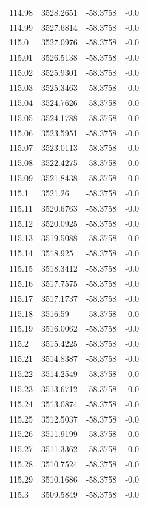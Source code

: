 \begin{table}[H]
\begin{tabular}{llll}
114.98 & 3528.2651 & -58.3758 & -0.0 \\
114.99 & 3527.6814 & -58.3758 & -0.0 \\
115.0 & 3527.0976 & -58.3758 & -0.0 \\
115.01 & 3526.5138 & -58.3758 & -0.0 \\
115.02 & 3525.9301 & -58.3758 & -0.0 \\
115.03 & 3525.3463 & -58.3758 & -0.0 \\
115.04 & 3524.7626 & -58.3758 & -0.0 \\
115.05 & 3524.1788 & -58.3758 & -0.0 \\
115.06 & 3523.5951 & -58.3758 & -0.0 \\
115.07 & 3523.0113 & -58.3758 & -0.0 \\
115.08 & 3522.4275 & -58.3758 & -0.0 \\
115.09 & 3521.8438 & -58.3758 & -0.0 \\
115.1 & 3521.26 & -58.3758 & -0.0 \\
115.11 & 3520.6763 & -58.3758 & -0.0 \\
115.12 & 3520.0925 & -58.3758 & -0.0 \\
115.13 & 3519.5088 & -58.3758 & -0.0 \\
115.14 & 3518.925 & -58.3758 & -0.0 \\
115.15 & 3518.3412 & -58.3758 & -0.0 \\
115.16 & 3517.7575 & -58.3758 & -0.0 \\
115.17 & 3517.1737 & -58.3758 & -0.0 \\
115.18 & 3516.59 & -58.3758 & -0.0 \\
115.19 & 3516.0062 & -58.3758 & -0.0 \\
115.2 & 3515.4225 & -58.3758 & -0.0 \\
115.21 & 3514.8387 & -58.3758 & -0.0 \\
115.22 & 3514.2549 & -58.3758 & -0.0 \\
115.23 & 3513.6712 & -58.3758 & -0.0 \\
115.24 & 3513.0874 & -58.3758 & -0.0 \\
115.25 & 3512.5037 & -58.3758 & -0.0 \\
115.26 & 3511.9199 & -58.3758 & -0.0 \\
115.27 & 3511.3362 & -58.3758 & -0.0 \\
115.28 & 3510.7524 & -58.3758 & -0.0 \\
115.29 & 3510.1686 & -58.3758 & -0.0 \\
115.3 & 3509.5849 & -58.3758 & -0.0 \\

\end{tabular}
\end{table}
